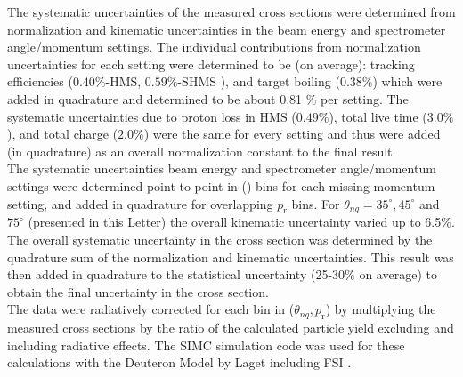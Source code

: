 \indent The systematic uncertainties of the measured cross sections were determined from 
normalization and kinematic uncertainties in the beam energy and spectrometer angle/momentum settings. The individual
contributions from normalization uncertainties for each setting were determined to be (on average): tracking efficiencies ($0.40 \%$-HMS, $0.59 \%$-SHMS ),
and target boiling ($0.38 \%$) which were added in quadrature and determined to be about 0.81 $\%$ per setting. The systematic uncertainties due to
proton loss in HMS ($0.49 \%$), total live time ($3.0 \%$), and total charge ($2.0\%$) were the same for every setting and thus were added (in quadrature)
as an overall normalization constant to the final result.\\
\indent The systematic uncertainties \DIFdelbegin {}\DIFdelend \DIFaddbegin {}\DIFaddend beam energy and spectrometer angle/momentum settings were
determined point-to-point in (\DIFdelbegin {}\DIFdelend \DIFaddbegin {}\DIFaddend ) bins for each missing momentum setting, and added in quadrature for overlapping $p_{\mathrm{r}}$ bins. 
For $\theta_{nq}= 35^{\circ}, 45^{\circ}$ and $75^{\circ}$ (presented in this Letter) the overall kinematic uncertainty varied up to 6.5$\%$.
The overall systematic uncertainty in the cross section was determined by the quadrature sum of the normalization and kinematic uncertainties. This result was then added in quadrature
to the statistical uncertainty (25-30$\%$ on average) to obtain the final uncertainty in the cross section. \\
\indent The data were radiatively corrected for each bin in ($\theta_{nq}, p_{\mathrm{r}}$) by multiplying the measured cross sections by the ratio of the calculated particle yield excluding and including radiative effects. The SIMC simulation code was used for these calculations with the Deuteron Model by \DIFdelbegin {}\DIFdelend Laget including FSI \cite{LAGET2005}.
